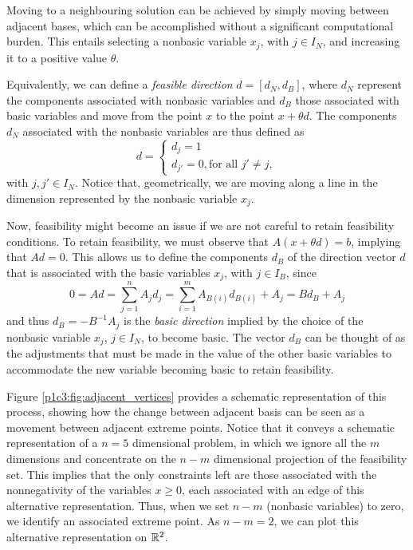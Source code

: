 Moving to a neighbouring solution can be achieved by simply moving between adjacent bases, which can be accomplished without a significant computational burden. This entails selecting a nonbasic variable $x_j$, with $j \in I_N$, and increasing it to a positive value $\theta$. 

Equivalently, we can define a \emph{feasible direction} $d = [d_N, d_B]$, where $d_N$ represent the components associated with nonbasic variables and $d_B$ those associated with basic variables and move from the point $x$ to the point $x + \theta d$. The components $d_N$ associated with the nonbasic variables are thus defined as 
%
\begin{equation*}
d = \begin{cases} d_j = 1 \\ 
				  d_{j'} = 0, \text{for all } j' \neq j, 
	\end{cases}	
\end{equation*}
%
with $j, j' \in I_N$. Notice that, geometrically, we are moving along a line in the dimension represented by the nonbasic variable $x_j$.

Now, feasibility might become an issue if we are not careful to retain feasibility conditions. To retain feasibility, we must observe that $A(x + \theta d) = b$, implying that $Ad = 0$. This allows us to define the components $d_B$ of the direction vector $d$ that is associated with the basic variables $x_j$, with $j \in I_B$, since
%
\begin{equation*}
	0 = Ad = \sum_{j = 1}^n	A_j d_j = \sum_{i = 1}^m A_{B(i)}d_{B(i)} + A_j = Bd_B + A_j
\end{equation*}
%
and thus $d_B = -B^{-1} A_j$ is the \emph{basic direction} implied by the choice of the nonbasic variable $x_j$, $j \in I_N$, to become basic. The vector $d_B$ can be thought of as the adjustments that must be made in the value of the other basic variables to accommodate the new variable becoming basic to retain feasibility. 


Figure \ref{p1c3:fig:adjacent_vertices} provides a schematic representation of this process, showing how the change between adjacent basis can be seen as a movement between adjacent extreme points. Notice that it conveys a schematic representation of a $n=5$ dimensional problem, in which we ignore all the $m$ dimensions and concentrate on the $n-m$ dimensional projection of the feasibility set. This implies that the only constraints left are those associated with the nonnegativity of the variables $x \ge 0$, each associated with an edge of this alternative representation. Thus, when we set $n-m$ (nonbasic variables) to zero, we identify an associated extreme point. As $n-m = 2$, we can plot this alternative representation on $\mathbb{R}^2$.

